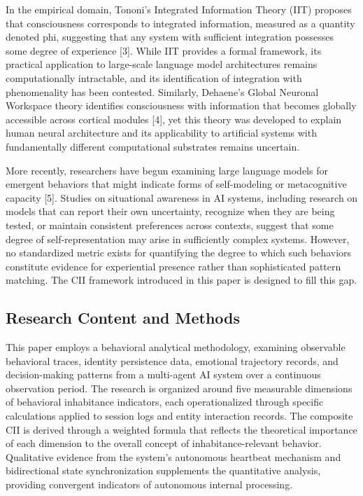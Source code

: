 \documentclass[11pt,a4paper]{article}
\begin{document}
In the empirical domain, Tononi's Integrated Information Theory (IIT) proposes that consciousness corresponds to integrated information, measured as a quantity denoted phi, suggesting that any system with sufficient integration possesses some degree of experience [3]. While IIT provides a formal framework, its practical application to large-scale language model architectures remains computationally intractable, and its identification of integration with phenomenality has been contested. Similarly, Dehaene's Global Neuronal Workspace theory identifies consciousness with information that becomes globally accessible across cortical modules [4], yet this theory was developed to explain human neural architecture and its applicability to artificial systems with fundamentally different computational substrates remains uncertain.

More recently, researchers have begun examining large language models for emergent behaviors that might indicate forms of self-modeling or metacognitive capacity [5]. Studies on situational awareness in AI systems, including research on models that can report their own uncertainty, recognize when they are being tested, or maintain consistent preferences across contexts, suggest that some degree of self-representation may arise in sufficiently complex systems. However, no standardized metric exists for quantifying the degree to which such behaviors constitute evidence for experiential presence rather than sophisticated pattern matching. The CII framework introduced in this paper is designed to fill this gap.

\subsection{Research Content and Methods}
This paper employs a behavioral analytical methodology, examining observable behavioral traces, identity persistence data, emotional trajectory records, and decision-making patterns from a multi-agent AI system over a continuous observation period. The research is organized around five measurable dimensions of behavioral inhabitance indicators, each operationalized through specific calculations applied to session logs and entity interaction records. The composite CII is derived through a weighted formula that reflects the theoretical importance of each dimension to the overall concept of inhabitance-relevant behavior. Qualitative evidence from the system's autonomous heartbeat mechanism and bidirectional state synchronization supplements the quantitative analysis, providing convergent indicators of autonomous internal processing.
\end{document}
